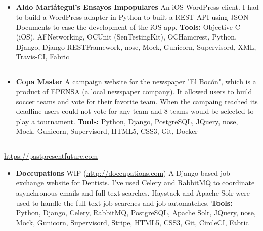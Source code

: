 \documentclass[11pt,a4paper,english]{moderncv}
\begin{document}
\subsection{}

{
\begin{itemize}
    \item \textbf{Aldo Mariátegui's Ensayos Impopulares}
        \newline{}
        An iOS-WordPress client. I had to build a WordPress adapter in Python to built a REST API using JSON Documents to ease the development of the iOS app.
        \newline{}
        \textbf{Tools:} Objective-C (iOS), AFNetworking, OCUnit (SenTestingKit), OCHamcrest, Python, Django, Django RESTFramework, nose, Mock, Gunicorn, Supervisord, XML, Travis-CI, Fabric
\end{itemize}
}

\subsection{}

{
\begin{itemize}
    \item \textbf{Copa Master}
        \newline{}
        A campaign website for the newspaper "El Bocón", which is a product of EPENSA (a local newspaper company). It allowed users to build soccer teams and vote for their favorite team. When the campaing reached its deadline users could not vote for any team and 8 teams would be selected to play a tournament.
        \newline{}
        \textbf{Tools:} Python, Django, PostgreSQL, JQuery, nose, Mock, Gunicorn, Supervisord, HTML5, CSS3, Git, Docker
\end{itemize}
}

\subsection{}

{
\url{https://pastpresentfuture.com}
\newline{}
\begin{itemize}
    \item \textbf{Doccupations}
        \newline{}
        WIP (\url{http://doccupations.com})
        \newline{}
        A Django-based job-exchange website for Dentists. I've used Celery and RabbitMQ to coordinate asynchronous emails and full-text searches. Haystack and Apache Solr were used to handle the full-text job searches and job automatches.
        \newline{}
        \textbf{Tools:} Python, Django, Celery, RabbitMQ, PostgreSQL, Apache Solr, JQuery, nose, Mock, Gunicorn, Supervisord, Stripe, HTML5, CSS3, Git, CircleCI, Fabric
\end{itemize}
}
\end{document}
